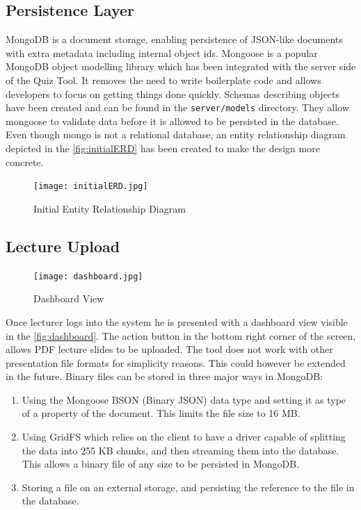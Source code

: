 \subsection{Persistence Layer}
MongoDB is a document storage, enabling persistence of JSON-like documents with extra metadata
including internal object ids. Mongoose\cite{48} is a popular MongoDB object modelling library which has
been integrated with the server side of the Quiz Tool. It removes the need to write boilerplate code and
allows developers to focus on getting things done quickly. Schemas describing objects have been created
and can be found in the \texttt{server/models} directory. They allow mongoose to validate data before
it is allowed to be persisted in the database. Even though mongo is not a relational database, an
entity relationship diagram depicted in the \autoref{fig:initialERD} has been created to make the design more concrete.

\begin{figure}[h!]
    \centering
    \texttt{[image: initialERD.jpg]}
    \caption{Initial Entity Relationship Diagram}
    \label{fig:initialERD}
\end{figure}

\subsection{Lecture Upload}

\begin{figure}[h!]
    \centering
    \texttt{[image: dashboard.jpg]}
    \caption{Dashboard View}
    \label{fig:dashboard}
\end{figure}

Once lecturer logs into the system he is presented with a dashboard view visible in the \autoref{fig:dashboard}.
The action button in the bottom right corner of the screen, allows PDF lecture slides to be uploaded.
The tool does not work with other presentation file formats for simplicity reasons. This could however
be extended in the future. Binary files can be stored in three major ways in MongoDB:

\begin{enumerate}
  \item Using the Mongoose BSON (Binary JSON)\cite{49} data type and setting it as type of a property of the document.
    This limits the file size to 16 MB.
  \item Using GridFS\cite{50} which relies on the client to have a driver capable of splitting the data into 255 KB
    chunks, and then streaming them into the database. This allows a binary file of any size to be persisted
    in MongoDB.
  \item Storing a file on an external storage, and persisting the reference to the file in the database.
\end{enumerate}

